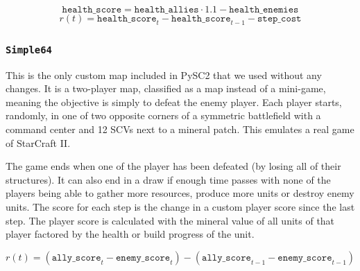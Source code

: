 $$
\texttt{health\_score} = \texttt{health\_allies} \cdot 1.1 - \texttt{health\_enemies}
$$
$$
r(t) = \texttt{health\_score}_{t} - \texttt{health\_score}_{t-1} - \texttt{step\_cost}
$$

\subsubsection*{\texttt{Simple64}}

This is the only custom map included in PySC2 that we used without any changes. It is a two-player map, classified as a  map instead of a mini-game, meaning the objective is simply to defeat the enemy player. Each player starts, randomly, in one of two opposite corners of a symmetric battlefield with a command center and 12 SCVs next to a mineral patch. This emulates a real game of StarCraft II.

The game ends when one of the player has been defeated (by losing all of their structures). It can also end in a draw if enough time passes with none of the players being able to gather more resources, produce more units or destroy enemy units. The score for each step is the change in a custom player score since the last step. The player score is calculated with the mineral value of all units of that player factored by the health or build progress of the unit.

$$
r(t) = (\texttt{ally\_score}_{t} - \texttt{enemy\_score}_{t}) - (\texttt{ally\_score}_{t-1} - \texttt{enemy\_score}_{t-1})
$$